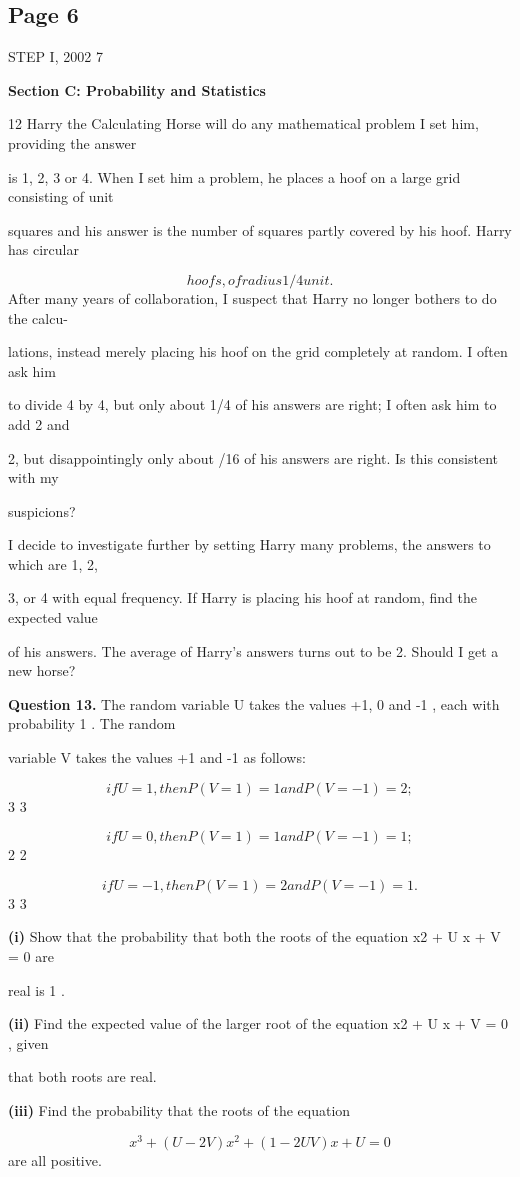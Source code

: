 \documentclass[12pt]{article}
\begin{document}
\subsection*{Page 6}
\begin{flushleft}
STEP I, 2002 7\par
\bigskip\textbf{Section C: Probability and Statistics}\par
12 Harry the Calculating Horse will do any mathematical problem I set him, providing the answer\par
is 1, 2, 3 or 4. When I set him a problem, he places a hoof on a large grid consisting of unit\par
squares and his answer is the number of squares partly covered by his hoof. Harry has circular\par
\[hoofs, of radius 1/4 unit.\]
After many years of collaboration, I suspect that Harry no longer bothers to do the calcu-\par
lations, instead merely placing his hoof on the grid completely at random. I often ask him\par
to divide 4 by 4, but only about 1/4 of his answers are right; I often ask him to add 2 and\par
2, but disappointingly only about \pi/16 of his answers are right. Is this consistent with my\par
suspicions?\par
I decide to investigate further by setting Harry many problems, the answers to which are 1, 2,\par
3, or 4 with equal frequency. If Harry is placing his hoof at random, find the expected value\par
of his answers. The average of Harry's answers turns out to be 2. Should I get a new horse?\par
\bigskip\textbf{Question 13.} The random variable U takes the values +1, 0 and -1 , each with probability 1 . The random\par
variable V takes the values +1 and -1 as follows:\par
\[if U = 1 , then P(V = 1) = 1 and P(V = -1) = 2 ;\]
3 3\par
\[if U = 0 , then P(V = 1) = 1 and P(V = -1) = 1 ;\]
2 2\par
\[if U = -1 , then P(V = 1) = 2 and P(V = -1) = 1 .\]
3 3\par
\textbf{(i)} Show that the probability that both the roots of the equation x2 + U x + V = 0 are\par
real is 1 .\par
\textbf{(ii)} Find the expected value of the larger root of the equation x2 + U x + V = 0 , given\par
that both roots are real.\par
\textbf{(iii)} Find the probability that the roots of the equation\par
\[x^3 + (U - 2V )x^2 + (1 - 2U V )x + U = 0\]
are all positive.\par
\end{flushleft}
\end{document}
